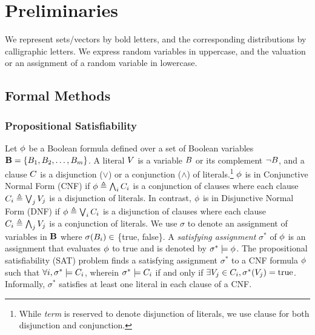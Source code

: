 \chapter{Preliminaries}
\label{chapter:preliminaries}
We represent sets/vectors by bold letters, and the corresponding distributions by calligraphic letters. We express random variables in uppercase, and the valuation or an assignment of a random variable in lowercase.




\section{Formal Methods}

\subsection{Propositional Satisfiability}

Let $\phi$ be a Boolean formula defined over a set of Boolean variables $\mathbf{B} = \{B_1,B_2,\dots ,B_m \}$. A literal $ V $ is a variable $ B $ or its complement $\neg B$, and a clause $ C $ is a disjunction ($ \vee $) or a conjunction ($ \wedge $) of literals.\footnote{While \emph{term} is reserved to denote disjunction of literals, we use clause for both disjunction and conjunction.}  $\phi$ is in Conjunctive Normal Form (CNF) if $\phi \triangleq  \bigwedge_i C_i$ is a conjunction of clauses where each clause $C_i \triangleq  \bigvee_j V_j $  is a disjunction of literals. In contrast, $ \phi $ is in Disjunctive Normal Form (DNF) if $\phi \triangleq  \bigvee_i C_i$ is a disjunction of clauses where each clause $C_i \triangleq  \bigwedge_j V_j $ is a conjunction of literals. We use $\sigma$ to denote an assignment of variables in  $\mathbf{B}$ where $ \sigma(B_i) \in $ \{true, false\}. A \emph{satisfying assignment} $ \sigma^* $ of $\phi$ is an assignment  that evaluates $\phi$  to true and is denoted by $ \sigma^* \models \phi $. The propositional satisfiability (SAT) problem finds a satisfying assignment $ \sigma^* $ to a CNF formula $ \phi $  such that $ \forall i, \sigma^* \models C_i $, wherein $ \sigma^*\models C_i $ if and only if $ \exists V_j \in C_i, \sigma^*(V_j) = \text{true} $. Informally, $ \sigma^* $ satisfies at least one literal in each clause of a CNF. 





